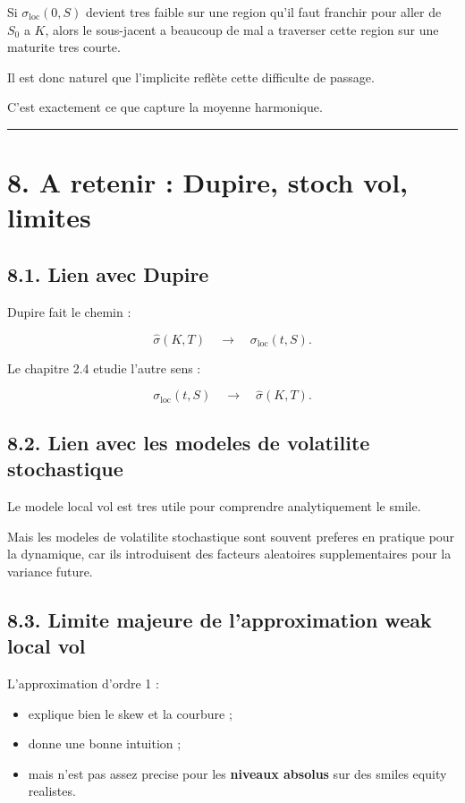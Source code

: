 \documentclass[11pt,a4paper]{article}
\begin{document}
Si \(\sigma_{\mathrm{loc}}(0,S)\) devient tres faible sur une region qu'il faut franchir pour aller de \(S_0\) a \(K\), alors le sous-jacent a beaucoup de mal a traverser cette region sur une maturite tres courte.

Il est donc naturel que l'implicite reflète cette difficulte de passage.

C'est exactement ce que capture la moyenne harmonique.

\bigskip\hrule\bigskip

\section{8. A retenir : Dupire, stoch vol, limites}

\subsection{8.1. Lien avec Dupire}

Dupire fait le chemin :

\[
\widehat{\sigma}(K,T)\quad \longrightarrow \quad \sigma_{\mathrm{loc}}(t,S).
\]

Le chapitre 2.4 etudie l'autre sens :

\[
\sigma_{\mathrm{loc}}(t,S)\quad \longrightarrow \quad \widehat{\sigma}(K,T).
\]

\subsection{8.2. Lien avec les modeles de volatilite stochastique}

Le modele local vol est tres utile pour comprendre analytiquement le smile.

Mais les modeles de volatilite stochastique sont souvent preferes en pratique pour la dynamique, car ils introduisent des facteurs aleatoires supplementaires pour la variance future.

\subsection{8.3. Limite majeure de l'approximation weak local vol}

L'approximation d'ordre 1 :

\begin{itemize}
\item explique bien le skew et la courbure ;
\item donne une bonne intuition ;
\item mais n'est pas assez precise pour les \textbf{niveaux absolus} sur des smiles equity realistes.
\end{itemize}
\end{document}
